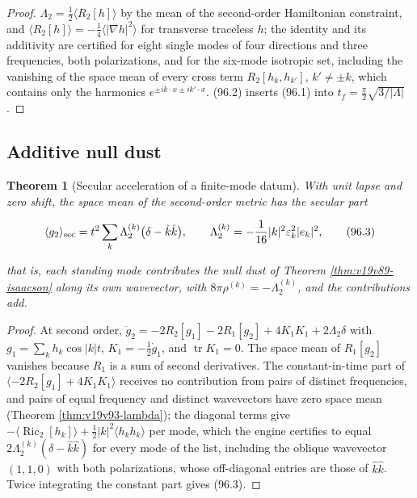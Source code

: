 \documentclass[11pt]{article}
\newtheorem{theorem}{Theorem}[section]
\theoremstyle{remark}
\begin{document}
\begin{proof}
\(\Lambda_2=\tfrac12\langle R_2[h]\rangle\) by the mean of the
second-order Hamiltonian constraint, and \(\langle R_2[h]\rangle=-\tfrac14\langle|\nabla h|^2\rangle\)
for transverse traceless \(h\); the identity and its additivity are
certified for eight single modes of four directions and three
frequencies, both polarizations, and for the six-mode isotropic set,
including the vanishing of the space mean of every cross term
\(R_2[h_k,h_{k'}]\), \(k'\neq\pm k\), which contains only the
harmonics \(e^{\pm ik\cdot x\pm ik'\cdot x}\).  (96.2) inserts (96.1)
into \(t_f=\tfrac\pi2\sqrt{3/|\Lambda|}\).
\end{proof}

\subsection{Additive null dust}

\begin{theorem}[Secular acceleration of a finite-mode datum]
\label{thm:v19v93-nulldust}
With unit lapse and zero shift, the space mean of the second-order
metric has the secular part

\[
 \langle g_2\rangle_{\rm sec}=t^2\sum_k\Lambda_2^{(k)}\bigl(\delta-\hat k\hat k\bigr),
 \qquad \Lambda_2^{(k)}=-\frac1{16}|k|^2\varepsilon_k^2|e_k|^2,        \tag{96.3}
\]

that is, each standing mode contributes the null dust of Theorem
\ref{thm:v19v89-isaacson} along its own wavevector, with
\(8\pi\rho^{(k)}=-\Lambda_2^{(k)}\), and the contributions add.
\end{theorem}

\begin{proof}
At second order, \(\ddot g_2=-2R_2[g_1]-2R_1[g_2]+4K_1K_1+2\Lambda_2\delta\)
with \(g_1=\sum_kh_k\cos|k|t\), \(K_1=-\tfrac12\dot g_1\), and
\(\operatorname{tr}K_1=0\).  The space mean of \(R_1[g_2]\) vanishes
because \(R_1\) is a sum of second derivatives.  The constant-in-time
part of \(\langle-2R_2[g_1]+4K_1K_1\rangle\) receives no contribution
from pairs of distinct frequencies, and pairs of equal frequency and
distinct wavevectors have zero space mean (Theorem
\ref{thm:v19v93-lambda}); the diagonal terms give
\(-\langle\operatorname{Ric}_2[h_k]\rangle+\tfrac12|k|^2\langle h_kh_k\rangle\)
per mode, which the engine certifies to equal
\(2\Lambda_2^{(k)}(\delta-\hat k\hat k)\) for every mode of the list,
including the oblique wavevector \((1,1,0)\) with both polarizations,
whose off-diagonal entries are those of \(\hat k\hat k\).  Twice
integrating the constant part gives (96.3).
\end{proof}
\end{document}
